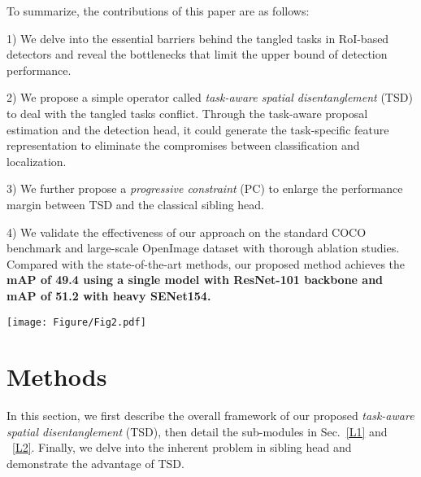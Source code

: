 \documentclass[10pt,twocolumn,letterpaper]{article}
\def \algfullname{\emph{task-aware spatial disentanglement}}
\def \algname{TSD}
\def \loss{PC}
\begin{document}
To summarize, the contributions of this paper are as follows:

1) We delve into the essential barriers behind the tangled tasks in RoI-based detectors and reveal the bottlenecks that limit the upper bound of detection performance.

2) We propose a simple operator called \algfullname{} (\algname{}) to deal with the tangled tasks conflict. Through the task-aware proposal estimation and the detection head, it could generate the task-specific feature representation to eliminate the compromises between classification and localization.

3) We further propose a \emph{progressive constraint} (\loss{}) to enlarge the performance margin between \algname{} and the classical sibling head.

4) We validate the effectiveness of our approach on the standard COCO benchmark and large-scale OpenImage dataset with thorough ablation studies. 
Compared with the state-of-the-art methods,
our proposed method achieves the \textbf{mAP of 49.4 using 
a single model with ResNet-101 backbone and mAP of 51.2 with heavy SENet154.}






\begin{figure*}[t!]
\centering
\texttt{[image: Figure/Fig2.pdf]}
   \caption{Illustration of the proposed \algname{} cooperated with Faster RCNN~\cite{ren2015faster}. Input images are first fed into the FPN backbone and then, region proposal $P$ is generated by RPN. \algname{} adopts the RoI feature of $P$ as input and estimates the derived proposals $\hat{P}_c$ and $\hat{P}_r$ for classification and localization. Finally, two parallel branches are used to predict specific category and regress precise box, respectively.}
\label{fig:intro}
\end{figure*}









\section{Methods}
In this section, we first describe the overall framework of our proposed \algfullname{} (\algname{}), then detail the sub-modules in Sec.~\ref{L1} and ~\ref{L2}. Finally, we delve into the inherent problem in sibling head and demonstrate the advantage of \algname{}.
\end{document}
